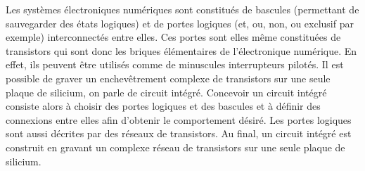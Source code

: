 Les systèmes électroniques numériques sont constitués de bascules (permettant de
sauvegarder des états logiques) et de portes logiques (et, ou, non, ou exclusif par
exemple) interconnectés entre elles. Ces portes sont elles même constituées de
transistors qui sont donc les briques élémentaires de l'électronique numérique. En
effet, ils peuvent être utilisés comme de minuscules interrupteurs pilotés. Il est
possible de graver un enchevêtrement complexe de transistors sur une seule plaque de
silicium, on parle de circuit intégré.  Concevoir un circuit intégré consiste alors à
choisir des portes logiques et des bascules et à définir des connexions entre elles
afin d'obtenir le comportement désiré.  Les portes logiques sont aussi décrites par
des réseaux de transistors.  Au final, un circuit intégré est construit en gravant un
complexe réseau de transistors sur une seule plaque de silicium.


